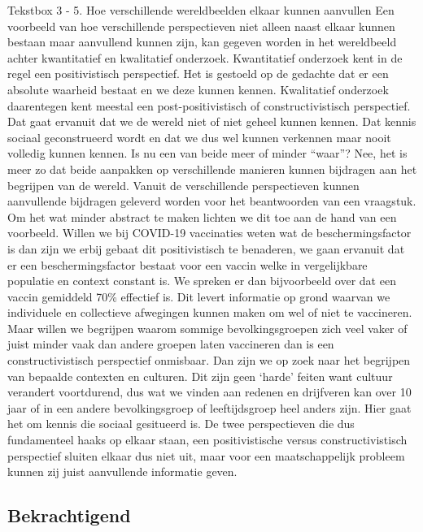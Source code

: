 \documentclass[smallauthor, chapterhaspagenum, nochapterinheader, pagenuminheader,  bigchapnum,medium2, tocpages,  garamond, titleinheader]{jote-book}
\begin{document}
	\begin{bookbox}{Tekstbox 3 - 5. Hoe verschillende wereldbeelden elkaar kunnen aanvullen}
		Een voorbeeld van hoe verschillende perspectieven niet alleen naast elkaar kunnen bestaan maar aanvullend kunnen zijn, kan gegeven worden in het wereldbeeld achter kwantitatief en kwalitatief onderzoek. Kwantitatief onderzoek kent in de regel een positivistisch perspectief. Het is gestoeld op de gedachte dat er een absolute waarheid bestaat en we deze kunnen kennen. Kwalitatief onderzoek daarentegen kent meestal een post-positivistisch of constructivistisch perspectief. Dat gaat ervanuit dat we de wereld niet of niet geheel kunnen kennen. Dat kennis sociaal geconstrueerd wordt en dat we dus wel kunnen verkennen maar nooit volledig kunnen kennen. Is nu een van beide meer of minder “waar”? Nee, het is meer zo dat beide aanpakken op verschillende manieren kunnen bijdragen aan het begrijpen van de wereld. Vanuit de verschillende perspectieven kunnen aanvullende bijdragen geleverd worden voor het beantwoorden van een vraagstuk. Om het wat minder abstract te maken lichten we dit toe aan de hand van een voorbeeld. Willen we bij COVID-19 vaccinaties weten wat de beschermingsfactor is dan zijn we erbij gebaat dit positivistisch te benaderen, we gaan ervanuit dat er een beschermingsfactor bestaat voor een vaccin welke in vergelijkbare populatie en context constant is. We spreken er dan bijvoorbeeld over dat een vaccin gemiddeld 70\% effectief is. Dit levert informatie op grond waarvan we individuele en collectieve afwegingen kunnen maken om wel of niet te vaccineren. Maar willen we begrijpen waarom sommige bevolkingsgroepen zich veel vaker of juist minder vaak dan andere groepen laten vaccineren dan is een constructivistisch perspectief onmisbaar. Dan zijn we op zoek naar het begrijpen van bepaalde contexten en culturen. Dit zijn geen ‘harde' feiten want cultuur verandert voortdurend, dus wat we vinden aan redenen en drijfveren kan over 10 jaar of in een andere bevolkingsgroep of leeftijdsgroep heel anders zijn. Hier gaat het om kennis die sociaal gesitueerd is. De twee perspectieven die dus fundamenteel haaks op elkaar staan, een positivistische versus constructivistisch perspectief sluiten elkaar dus niet uit, maar voor een maatschappelijk probleem kunnen zij juist aanvullende informatie geven.
	\end{bookbox}

	\subsection{Bekrachtigend}
\end{document}
